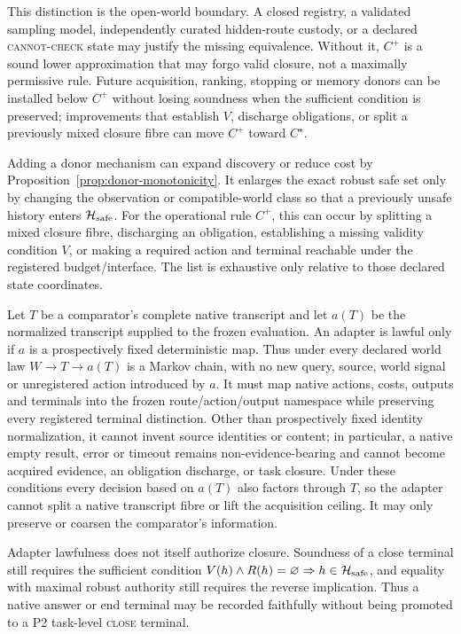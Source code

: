 This distinction is the open-world boundary. A closed registry, a validated
sampling model, independently curated hidden-route custody, or a declared
\textsc{cannot-check} state may justify the missing equivalence. Without it,
$C^+$ is a sound lower approximation that may forgo valid closure, not a
maximally permissive rule. Future acquisition, ranking, stopping or memory
donors can be installed below $C^+$ without losing soundness when the sufficient
condition is preserved; improvements that establish $V$, discharge obligations,
or split a previously mixed closure fibre can move $C^+$ toward $C^\star$.

\begin{corollary}
Adding a donor mechanism can expand discovery or reduce cost by
Proposition~\ref{prop:donor-monotonicity}. It enlarges the exact robust safe set
only by changing the observation or compatible-world class so that a previously
unsafe history enters $\mathcal H_{\rm safe}$. For the operational rule $C^+$,
this can occur by splitting a mixed closure fibre, discharging an obligation,
establishing a missing validity condition $V$, or making a required action and
terminal reachable under the registered budget/interface. The list is
exhaustive only relative to those declared state coordinates.
\end{corollary}

\begin{corollary}
Let $T$ be a comparator's complete native transcript and let $a(T)$ be the
normalized transcript supplied to the frozen evaluation. An adapter is lawful
only if $a$ is a prospectively fixed deterministic map. Thus under every
declared world law $W\to T\to a(T)$ is a Markov chain, with no new query,
source, world signal or unregistered action introduced by $a$. It must map
native actions, costs, outputs and terminals into the frozen
route/action/output namespace while preserving every registered terminal
distinction. Other than prospectively fixed identity normalization, it cannot
invent source identities or content; in particular, a native empty result,
error or timeout remains non-evidence-bearing and cannot become acquired
evidence, an obligation discharge, or task closure. Under these conditions
every decision based on $a(T)$ also factors through $T$, so the adapter cannot
split a native transcript fibre or lift the acquisition ceiling. It may only
preserve or coarsen the comparator's information.

Adapter lawfulness does not itself authorize closure. Soundness of a close
terminal still requires the sufficient condition
$V(h)\wedge R(h)=\varnothing\Rightarrow h\in\mathcal H_{\rm safe}$, and equality
with maximal robust authority still requires the reverse implication. Thus a
native answer or end terminal may be recorded faithfully without being
promoted to a P2 task-level \textsc{close} terminal.
\end{corollary}


